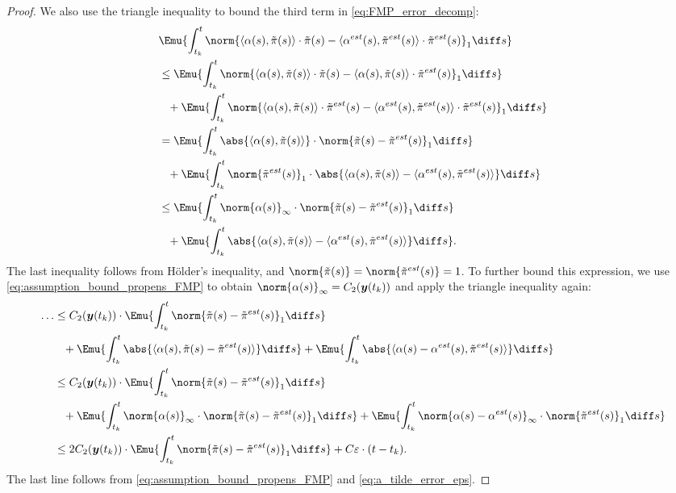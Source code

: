 \begin{proof}
We also use the triangle inequality to bound the third term in \eqref{eq:FMP_error_decomp}:
\begin{align*}
    &\Emu{ \int_{t_k}^{t} \norm{\langle \alpha(s), \Tilde{\pi}(s) \rangle \cdot \Tilde{\pi}(s) - \langle \alpha^{est}(s), \Tilde{\pi}^{est}(s) \rangle \cdot \Tilde{\pi}^{est}(s)}_1 \diff s } \\
    &\leq \Emu{ \int_{t_k}^{t} \norm{\langle \alpha(s), \Tilde{\pi}(s) \rangle \cdot \Tilde{\pi}(s) - \langle \alpha(s), \Tilde{\pi}(s) \rangle \cdot \Tilde{\pi}^{est}(s)}_1 \diff s } \\
    &\phantom{\leq} + \Emu{ \int_{t_k}^{t} \norm{\langle \alpha(s), \Tilde{\pi}(s) \rangle \cdot \Tilde{\pi}^{est}(s) - \langle \alpha^{est}(s), \Tilde{\pi}^{est}(s) \rangle \cdot \Tilde{\pi}^{est}(s)}_1 \diff s } \\
    &= \Emu{ \int_{t_k}^{t} \abs{\langle \alpha(s), \Tilde{\pi}(s) \rangle} \cdot \norm{\Tilde{\pi}(s) - \Tilde{\pi}^{est}(s)}_1 \diff s } \\
    &\phantom{\leq} + \Emu{ \int_{t_k}^{t} \norm{\Tilde{\pi}^{est}(s)}_1 \cdot \abs{\langle \alpha(s), \Tilde{\pi}(s) \rangle - \langle \alpha^{est}(s), \Tilde{\pi}^{est}(s) \rangle } \diff s } \\
    &\leq \Emu{ \int_{t_k}^{t} \norm{\alpha(s)}_{\infty} \cdot \norm{\Tilde{\pi}(s) - \Tilde{\pi}^{est}(s)}_1 \diff s } \\
    &\phantom{\leq} + \Emu{ \int_{t_k}^{t} \abs{\langle \alpha(s), \Tilde{\pi}(s) \rangle - \langle \alpha^{est}(s), \Tilde{\pi}^{est}(s) \rangle } \diff s }.
\end{align*}
The last inequality follows from H\"{o}lder's inequality, and $\norm{\Tilde{\pi}(s)} = \norm{\Tilde{\pi}^{est}(s)} = 1$. To further bound this expression, we use \eqref{eq:assumption_bound_propens_FMP} to obtain $\norm{\alpha(s)}_{\infty} = C_2(\boldsymbol{y}(t_k))$ and apply the triangle inequality again:
\begin{align*}
    \dots &\leq C_2(\boldsymbol{y}(t_k)) \cdot \Emu{ \int_{t_k}^{t} \norm{\Tilde{\pi}(s) - \Tilde{\pi}^{est}(s)}_1 \diff s } \\
    &\phantom{\leq} + \Emu{ \int_{t_k}^{t} \abs{\langle \alpha(s), \Tilde{\pi}(s) - \Tilde{\pi}^{est}(s) \rangle } \diff s } 
    + \Emu{ \int_{t_k}^{t} \abs{\langle \alpha(s) - \alpha^{est}(s), \Tilde{\pi}^{est} (s) \rangle } \diff s } \\
    &\leq C_2(\boldsymbol{y}(t_k)) \cdot \Emu{ \int_{t_k}^{t} \norm{\Tilde{\pi}(s) - \Tilde{\pi}^{est}(s)}_1 \diff s } \\
    &\phantom{\leq} + \Emu{ \int_{t_k}^{t}  \norm{\alpha(s)}_{\infty} \cdot \norm{ \Tilde{\pi}(s) - \Tilde{\pi}^{est}(s) }_1 \diff s } 
    + \Emu{ \int_{t_k}^{t} \norm{ \alpha(s) - \alpha^{est}(s) }_{\infty} \cdot \norm{ \Tilde{\pi}^{est} (s) }_1 \diff s } \\
    &\leq 2 C_2(\boldsymbol{y}(t_k)) \cdot \Emu{ \int_{t_k}^{t} \norm{\Tilde{\pi}(s) - \Tilde{\pi}^{est}(s)}_1 \diff s } + C \varepsilon \cdot (t - t_k).
\end{align*}
The last line follows from \eqref{eq:assumption_bound_propens_FMP} and \eqref{eq:a_tilde_error_eps}.


\end{proof}
